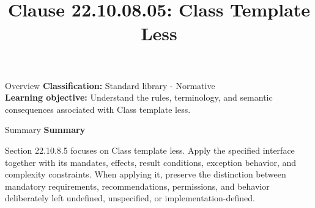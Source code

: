 \documentclass[10pt,letterpaper]{article}
\title{Clause 22.10.08.05: Class Template Less}
\author{}
\date{}
\begin{document}
\maketitle
\begin{CornellOverviewBox}{Overview}
\textbf{Classification:} Standard library - Normative\\[2pt]
\textbf{Learning objective:} Understand the rules, terminology, and semantic consequences associated with Class template less.
\end{CornellOverviewBox}\begin{CornellSummaryBox}{Summary}
{\sffamily\bfseries\color{Accent} Summary}\par\vspace{3pt}Section 22.10.8.5 focuses on Class template less. Apply the specified interface together with its mandates, effects, result conditions, exception behavior, and complexity constraints. When applying it, preserve the distinction between mandatory requirements, recommendations, permissions, and behavior deliberately left undefined, unspecified, or implementation-defined.
\end{CornellSummaryBox}
\end{document}
